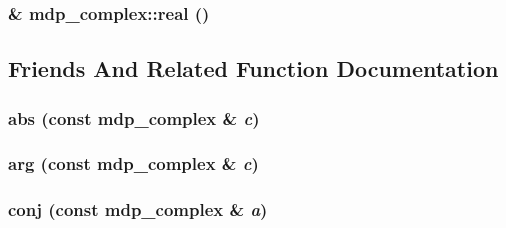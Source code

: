 \label{classmdp__complex_a7055611c45f5cfb6e12053d4e9bc77dd}
\hypertarget{classmdp__complex_ad24f185648ad4231abbf362ed1fab64b}{
\subsubsection[{real}]{\& mdp\_\-complex::real ()}}
\label{classmdp__complex_ad24f185648ad4231abbf362ed1fab64b}


\subsection{Friends And Related Function Documentation}
\hypertarget{classmdp__complex_a96b9b3b51ad22585b81f00888633ca37}{
\subsubsection[{abs}]{ abs (const {\bf mdp\_\-complex} \& {\em c})}}
\label{classmdp__complex_a96b9b3b51ad22585b81f00888633ca37}
\hypertarget{classmdp__complex_ab34d0f24b00ee0467009d6cb6c992ae1}{
\subsubsection[{arg}]{ arg (const {\bf mdp\_\-complex} \& {\em c})}}
\label{classmdp__complex_ab34d0f24b00ee0467009d6cb6c992ae1}
\hypertarget{classmdp__complex_a87d03a17271a85f700b7fa512c3e7db7}{
\subsubsection[{conj}]{ conj (const {\bf mdp\_\-complex} \& {\em a})}}
